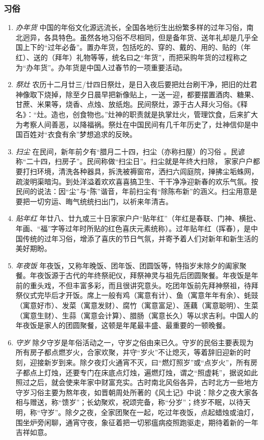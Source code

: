 \subsubsection{习俗}

\begin{enumerate}
    
\item \emph{办年货}
中国的年俗文化源远流长，全国各地衍生出纷繁多样的过年习俗，南北迥异，各具特色。虽然各地习俗不尽相同，但是备年货、送年礼却是几乎全国上下的“过年必备”。置办年货，包括吃的、穿的、戴的、用的、贴的（年红）、送的（拜年）礼物等等，统名曰之“年货”，而把采购年货的过程称之为“办年货”。办年货是中国人过春节的一项重要活动。

\item \emph{祭灶}
农历十二月廿三/廿四日祭灶，是日入夜后要把灶台刷干净，把旧的灶君神像取下烧掉，除至夕日晨早把新像贴上，一送一迎，都要摆置酒肉、糖果、甘蔗、米果等，烧香、点烛、放纸炮。民间祭灶，源于古人拜火习俗。《释名》：“灶。造也，创食物也。”灶神的职责就是执掌灶火，管理饮食，后来扩大为考察人间善恶，以降福祸。祭灶在中国民间有几千年历史了，灶神信仰是中国百姓对“衣食有余”梦想追求的反映。

\item  \emph{扫尘}
在民间，新年前夕有“腊月二十四，扫尘（亦称扫屋）的习俗 。民谚称“二十四，扫房子”。民间称做“扫尘日”。扫尘就是年终大扫除， 家家户户都要打扫环境，清洗各种器具，拆洗被褥窗帘，洒扫六闾庭院，掸拂尘垢蛛网，疏浚明渠暗沟。到处洋溢着欢欢喜喜搞卫生、干干净净迎新春的欢乐气氛。按民间的说法：因“尘”与“陈”谐音，年前扫尘有“除陈布新”的涵义。扫尘用意是要把一切穷运、晦气统统扫出门，以祈来年清吉。

\item \emph{贴年红}
年廿八、廿九或三十日家家户户“贴年红”（年红是春联、门神、横批、年画、“福”字等过年时所贴的红色喜庆元素统称）。过年贴年红（挥春），是中国传统的过年习俗，增添了喜庆的节日气氛，并寄予着人们对新年和新生活的美好期盼。

\item \emph{年夜饭}
年夜饭，又称年晚饭、团年饭、团圆饭等，特指岁末除夕的阖家聚餐。年夜饭源于古代的年终祭祀仪，拜祭神灵与祖先后团圆聚餐。年夜饭是年前的重头戏，不但丰富多彩，而且很讲究意头。吃团年饭前先拜神祭祖，待拜祭仪式完毕后才开饭。席上一般有鸡（寓意有计）、鱼（寓意年年有余）、蚝豉（寓意好市）、发菜（寓意发财）、腐竹（寓意富足）、莲藕（寓意聪明）、生菜（寓意生财）、生蒜（寓意会计算）、腊肠（寓意长久）等以求吉利。中国人的年夜饭是家人的团圆聚餐，这顿是年尾最丰盛、最重要的一顿晚餐。

\item \emph{守岁}
除夕守岁是年俗活动之一，守岁之俗由来已久。守岁的民俗主要表现为所有房子都点燃岁火，合家欢聚，并守“岁火”不让熄灭，等着辞旧迎新的时刻，迎接新岁到来。除夕夜灯火通宵不灭，曰“燃灯照岁”或“点岁火”，所有房子都点上灯烛，还要专门在床底点灯烛，遍燃灯烛，谓之“照虚耗”，据说如此照过之后，就会使来年家中财富充实。古时南北风俗各异，古时北方一些地方守岁习俗主要为熬年夜，如晋朝周处所著的《风土记》中说：除夕之夜大家各相与赠送，称“馈岁”；长幼聚欢，祝颂完备，称“分岁”；终岁不眠，以待天明，称“守岁”。除夕之夜，全家团聚在一起，吃过年夜饭，点起蜡烛或油灯，围坐炉旁闲聊，通宵守夜，象征着把一切邪瘟病疫照跑驱走，期待着新的一年吉祥如意。


\end{enumerate}
